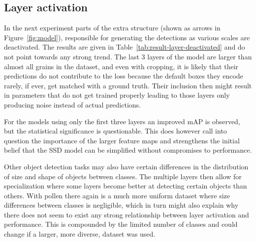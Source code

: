 \subsection{Layer activation}
In the next experiment parts of the extra structure (shown as arrows in Figure~\ref{fig:model}), responsible for generating the detections as various scales are deactivated.
The results are given in Table~\ref{tab:result-layer-deactivated} and do not point towards any strong trend.
The last 3 layers of the model are larger than almost all grains in the dataset, and even with cropping, it is likely that their predictions do not contribute to the loss because the default boxes they encode rarely, if ever, get matched with a ground truth.
Their inclusion then might result in parameters that do not get trained properly leading to those layers only producing noise instead of actual predictions.

For the models using only the first three layers an improved mAP is observed, but the statistical significance is questionable.
This does however call into question the importance of the larger feature maps and strengthens the initial belief that the SSD model can be simplified without compromises to performance.

Other object detection tasks may also have certain differences in the distribution of size and shape of objects between classes.
The multiple layers then allow for specialization where some layers become better at detecting certain objects than others.
With pollen there again is a much more uniform dataset where size differences between classes is negligible, which in turn might also explain why there does not seem to exist any strong relationship between layer activation and performance.
This is compounded by the limited number of classes and could change if a larger, more diverse, dataset was used.

